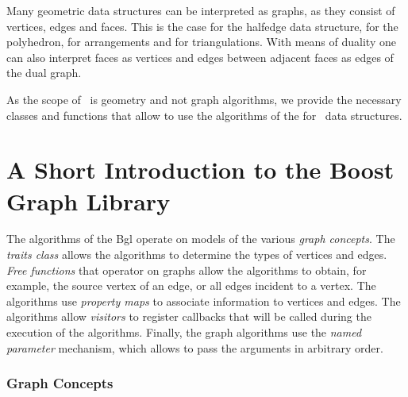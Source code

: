 

Many geometric data structures can be interpreted as graphs, as they consist of
vertices, edges and faces. This is the case for the halfedge data structure,
for the polyhedron, for arrangements and for triangulations. With means of
duality one can also interpret faces as vertices and edges between adjacent
faces as edges of the dual graph. 


As the scope of \cgal\ is geometry and not graph algorithms, we
provide the necessary classes and functions that allow to use the
algorithms of the  \cite{cgal:sll-bgl-02} for \cgal\ data structures.

\section{A Short Introduction to the Boost Graph Library}

The algorithms of the {\sc Bgl} operate on models of the various {\em graph concepts}. 
The {\em traits class}  allows the algorithms to determine the types of vertices and edges. 
{\em Free functions} that operator on graphs allow the algorithms to obtain,
for example, the source vertex of an edge, or  all edges incident to a vertex. The algorithms 
use {\em property maps} to associate information to vertices and edges. 
The algorithms allow {\em visitors} to register callbacks that will be called
during the execution of the algorithms. Finally, the graph algorithms use
the {\em named parameter} mechanism, which allows to pass the  arguments in
arbitrary order.


\subsubsection*{Graph Concepts}


